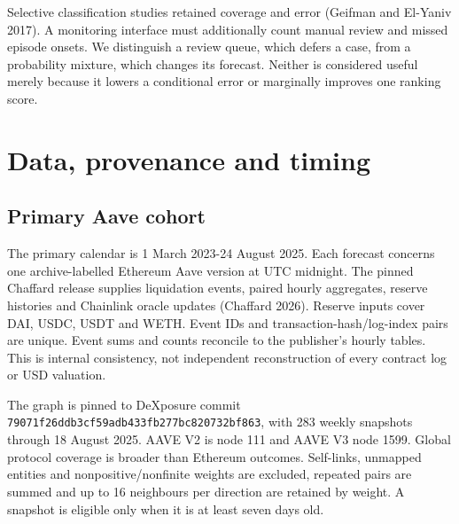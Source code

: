 \documentclass[
  10pt,
  a4paper,
]{article}
\begin{document}
Selective classification studies retained coverage and error (Geifman
and El-Yaniv 2017). A monitoring interface must additionally count
manual review and missed episode onsets. We distinguish a review queue,
which defers a case, from a probability mixture, which changes its
forecast. Neither is considered useful merely because it lowers a
conditional error or marginally improves one ranking score.

\section{Data, provenance and timing}\label{data-provenance-and-timing}

\subsection{Primary Aave cohort}\label{primary-aave-cohort}

The primary calendar is 1 March 2023-24 August 2025. Each forecast
concerns one archive-labelled Ethereum Aave version at UTC midnight. The
pinned Chaffard release supplies liquidation events, paired hourly
aggregates, reserve histories and Chainlink oracle updates (Chaffard
2026). Reserve inputs cover DAI, USDC, USDT and WETH. Event IDs and
transaction-hash/log-index pairs are unique. Event sums and counts
reconcile to the publisher's hourly tables. This is internal
consistency, not independent reconstruction of every contract log or USD
valuation.

The graph is pinned to DeXposure commit
\texttt{79071f26ddb3cf59adb433fb277bc820732bf863}, with 283 weekly
snapshots through 18 August 2025. AAVE V2 is node 111 and AAVE V3 node
1599. Global protocol coverage is broader than Ethereum outcomes.
Self-links, unmapped entities and nonpositive/nonfinite weights are
excluded, repeated pairs are summed and up to 16 neighbours per
direction are retained by weight. A snapshot is eligible only when it is
at least seven days old.
\end{document}
